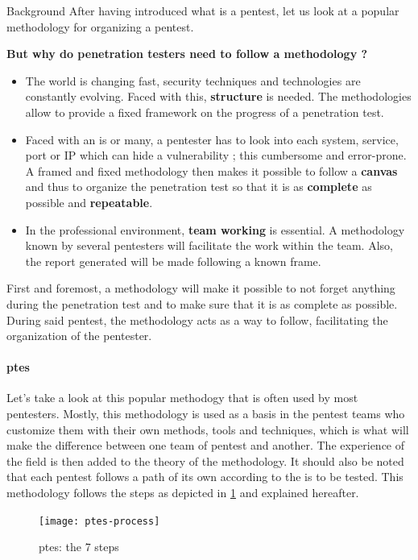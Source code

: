 \begin{chaptercover}{Background}
After having introduced what is a pentest, let us look at a popular methodology for organizing a pentest.

\begin{question}
\textbf{But why do penetration testers need to follow a methodology ?}
\begin{itemize}
  \item The world is changing fast, security techniques and technologies are constantly evolving. Faced with this, \textbf{structure} is needed. The methodologies allow to provide a fixed framework on the progress of a penetration test.
  \item Faced with an \acrshort{is} or many, a pentester has to look into each system, service, port or IP which can hide a vulnerability ; this cumbersome and error-prone. A framed and fixed methodology then makes it possible to follow a \textbf{canvas} and thus to organize the penetration test so that it is as \textbf{complete} as possible and \textbf{repeatable}.
  \item In the professional environment, \textbf{team working} is essential. A methodology known by several pentesters will facilitate the work within the team. Also, the report generated will be made following a known frame.
\end{itemize}
\end{question}

First and foremost, a methodology will make it possible to not forget anything during the penetration test and to make sure that it is as complete as possible. During said pentest, the methodology acts as a way to follow, facilitating the organization of the pentester.

\paragraph{\acrfull{ptes} \cite{ptes}} Let's take a look at this popular methodogy that is often used by most pentesters. Mostly, this methodology is used as a basis in the pentest teams who customize them with their own methods, tools and techniques, which is what will make the difference between one team of pentest and another. The experience of the field is then added to the theory of the methodology. It should also be noted that each pentest follows a path of its own according to the \acrshort{is} to be tested. This methodology follows the steps as depicted in \ref{fig:ptes-process} and explained hereafter.

\begin{figure}[H]
  \centering
  \texttt{[image: ptes-process]}
  \caption{\acrshort{ptes}: the 7 steps}
  \label{fig:ptes-process}
\end{figure}


\end{chaptercover}
